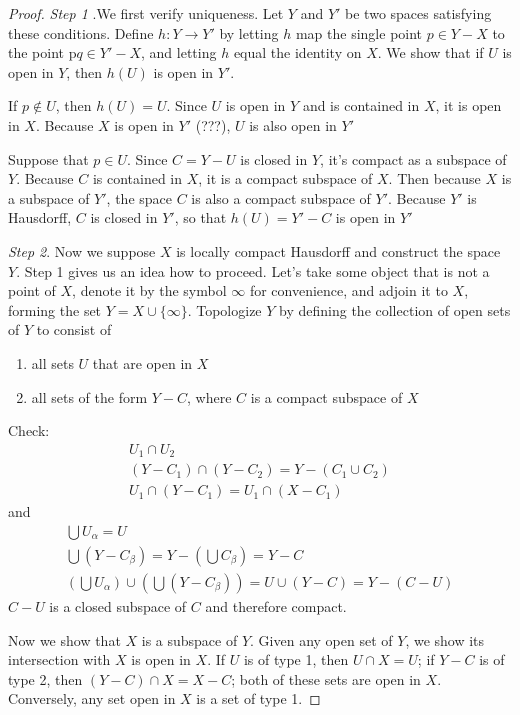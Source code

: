 \documentclass[11pt]{article}
\begin{document}
\begin{proof}
\emph{Step 1} .We first verify uniqueness. Let \(Y\) and \(Y'\) be two spaces satisfying these
conditions. Define \(h:Y\to Y'\) by letting \(h\) map the single point \(p\in Y-X\) to the
point p\(q\in Y'-X\), and letting \(h\) equal the identity on \(X\). We show that if \(U\) is open
in \(Y\), then \(h(U)\) is open in \(Y'\).

If \(p\not\in U\), then \(h(U)=U\). Since \(U\) is open in \(Y\) and is contained in \(X\), it is
open in \(X\). Because \(X\) is open in \(Y'\) (???), \(U\) is also open in \(Y'\)

Suppose that \(p\in U\). Since \(C=Y-U\) is closed in \(Y\), it's compact as a subspace of \(Y\).
Because \(C\) is contained in \(X\), it is a compact subspace of \(X\). Then because \(X\) is a
subspace of \(Y'\), the space \(C\) is also a compact subspace of \(Y'\). Because \(Y'\) is
Hausdorff, \(C\) is closed in \(Y'\), so that \(h(U)=Y'-C\) is open in \(Y'\)

\emph{Step 2}. Now we suppose \(X\) is locally compact Hausdorff and construct the space \(Y\). Step 1
gives us an idea how to proceed. Let's take some object that is not a point of \(X\), denote it
by the symbol \(\infty\) for convenience, and adjoin it to \(X\), forming the set \(Y=X\cup\{\infty\}\).
Topologize \(Y\) by defining the collection of open sets of \(Y\) to consist of
\begin{enumerate}
\item all sets \(U\) that are open in \(X\)
\item all sets of the form \(Y-C\), where \(C\) is a compact subspace of \(X\)
\end{enumerate}


Check:
\begin{gather*}
U_1\cap U_2\\
(Y-C_1)\cap(Y-C_2)=Y-(C_1\cup C_2)\\
U_1\cap(Y-C_1)=U_1\cap(X-C_1)
\end{gather*}
and
\begin{gather*}
\bigcup U_\alpha=U\\
\bigcup(Y-C_\beta)=Y-(\bigcup C_\beta)=Y-C\\
(\bigcup U_\alpha)\cup(\bigcup(Y-C_\beta))=U\cup(Y-C)=Y-(C-U)
\end{gather*}
\(C-U\) is a closed subspace of \(C\) and therefore compact.

Now we show that \(X\) is a subspace of \(Y\). Given any open set of \(Y\), we show its
intersection with \(X\) is open in \(X\).  If \(U\) is of type 1, then \(U\cap X=U\); if \(Y-C\) is
of type 2, then \((Y-C)\cap X=X-C\); both of these sets are open in \(X\). Conversely, any set open
in \(X\) is a set of type 1.


\end{proof}
\end{document}
